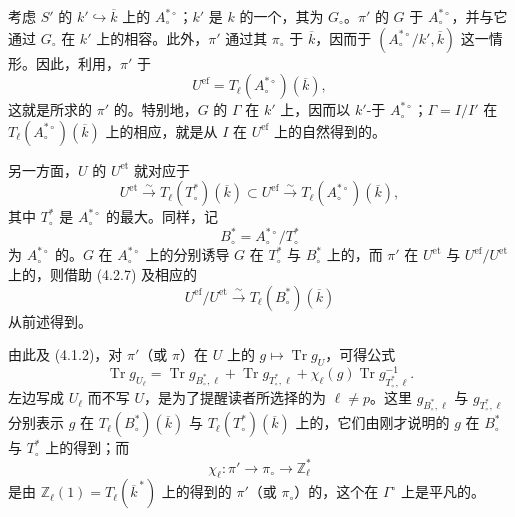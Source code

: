考虑 $S'$ 的 $k'\hookrightarrow\overline k$ 上的 $A_\circ^{*\circ}$；$k'$ 是 $k$ 的一个，其为 $G_\circ$。$\pi'$ 的 $G$ 于 $A_\circ^{*\circ}$，并与它通过 $G_\circ$ 在 $k'$ 上的相容。此外，$\pi'$ 通过其 $\pi_\circ$ 于 $\overline k$，因而于 $(A_\circ^{*\circ}/k',\overline k)$ 这一情形。因此，利用，$\pi'$ 于
\[
 U^{\mathrm{ef}}=T_\ell(A_\circ^{*\circ})(\overline k),
\]
这就是所求的 $\pi'$ 的。特别地，$G$ 的 $\Gamma$ 在 $k'$ 上，因而以 $k'$-于 $A_\circ^{*\circ}$；$\Gamma=I/I'$ 在 $T_\ell(A_\circ^{*\circ})(\overline k)$ 上的相应，就是从 $I$ 在 $U^{\mathrm{ef}}$ 上的自然得到的。

另一方面，$U$ 的 $U^{\mathrm{et}}$ 就对应于
\[
 U^{\mathrm{et}}\xrightarrow{\sim}T_\ell(T_\circ^*)(\overline k)
 \subset U^{\mathrm{ef}}\xrightarrow{\sim}T_\ell(A_\circ^{*\circ})(\overline k),
 \tag{4.2.7}
\]
其中 $T_\circ^*$ 是 $A_\circ^{*\circ}$ 的最大。同样，记
\[
 B_\circ^*=A_\circ^{*\circ}/T_\circ^* \tag{4.2.8}
\]
为 $A_\circ^{*\circ}$ 的。$G$ 在 $A_\circ^{*\circ}$ 上的分别诱导 $G$ 在 $T_\circ^*$ 与 $B_\circ^*$ 上的，而 $\pi'$ 在 $U^{\mathrm{et}}$ 与 $U^{\mathrm{ef}}/U^{\mathrm{et}}$ 上的，则借助 (4.2.7) 及相应的
\[
 U^{\mathrm{ef}}/U^{\mathrm{et}}\xrightarrow{\sim}T_\ell(B_\circ^*)(\overline k)
 \tag{4.2.9}
\]
从前述得到。

由此及 (4.1.2)，对 $\pi'$（或 $\pi$）在 $U$ 上的 $g\mapsto\operatorname{Tr}g_U$，可得公式
\[
 \operatorname{Tr}g_{U_\ell}
 =\operatorname{Tr}g_{B_\circ^*,\ell}
 +\operatorname{Tr}g_{T_\circ^*,\ell}
 +\chi_\ell(g)\operatorname{Tr}g_{T_\circ^*,\ell}^{-1}.
 \tag{4.2.10}
\]
左边写成 $U_\ell$ 而不写 $U$，是为了提醒读者所选择的为 $\ell\ne p$。这里 $g_{B_\circ^*,\ell}$ 与 $g_{T_\circ^*,\ell}$ 分别表示 $g$ 在 $T_\ell(B_\circ^*)(\overline k)$ 与 $T_\ell(T_\circ^*)(\overline k)$ 上的，它们由刚才说明的 $g$ 在 $B_\circ^*$ 与 $T_\circ^*$ 上的得到；而
\[
 \chi_\ell:\pi'\longrightarrow\pi_\circ\longrightarrow\mathbb Z_\ell^*
 \tag{4.2.11}
\]
是由 $\mathbb Z_\ell(1)=T_\ell(\overline k^{\,*})$ 上的得到的 $\pi'$（或 $\pi_\circ$）的，这个在 $\Gamma^\circ$ 上是平凡的。

